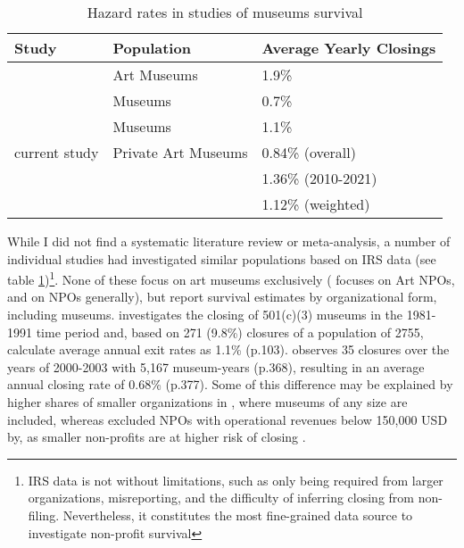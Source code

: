 \documentclass[12pt]{article}
\begin{document}
\begin{table}[htbp]
\caption{\label{tbl:litreview}Hazard rates in studies of museums survival}
\centering
\begin{tabular}{lll}
\hline
Study & Population & Average Yearly Closings\\
\hline
\cite{Hager_2001_vulnerability} & Art Museums & 1.9\%\\
\cite{Gordon_etal_2013_insolvency} & Museums & 0.7\%\\
\cite{Bowen_etal_1994_charitable} & Museums & 1.1\%\\
current study & Private Art Museums & 0.84\% (overall)\\
 &  & 1.36\% (2010-2021)\\
 &  & 1.12\% (weighted)\\
\hline
\end{tabular}
\end{table}

\FloatBarrier




While I did not find a systematic literature review or meta-analysis, a number of individual studies had investigated similar populations based on IRS data (see table \ref{tbl:litreview})\footnote{IRS data is not without limitations, such as only being required from larger organizations, misreporting, and the difficulty of inferring closing from non-filing. Nevertheless, it constitutes the most fine-grained data source to investigate non-profit survival}.
None of these focus on art museums exclusively (\textcite{Hager_2001_vulnerability} focuses on Art NPOs, \textcite{Bowen_etal_1994_charitable} and \textcite{Gordon_etal_2013_insolvency} on NPOs generally), but report survival estimates by organizational form, including museums.
\textcite{Bowen_etal_1994_charitable} investigates the closing of 501(c)(3) museums in the 1981-1991 time period and, based on 271 (9.8\%) closures of a population of 2755, calculate average annual exit rates as 1.1\% (p.103).
\textcite{Gordon_etal_2013_insolvency} observes 35 closures over the years of 2000-2003 with 5,167 museum-years (p.368), resulting in an average annual closing rate of 0.68\% (p.377).
Some of this difference may be explained by higher shares of smaller organizations in \textcite{Bowen_etal_1994_charitable}, where museums of any size are included, whereas \textcite{Gordon_etal_2013_insolvency} excluded NPOs with operational revenues below 150,000 USD by, as smaller non-profits are at higher risk of closing \parencite{Harrison_Laincz_2008_nonprofit,Helmig_Ingerfurth_Pinz_2013_nonprofit}.
\end{document}
